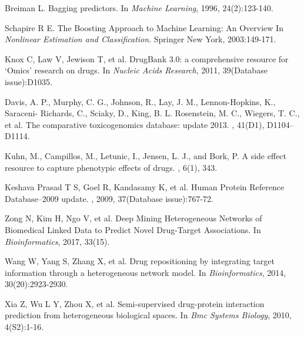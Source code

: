 \documentclass[conference]{IEEEtran}
\begin{document}
\begin{thebibliography}{10}
Breiman L. 
\newblock Bagging predictors. 
\newblock In {\em Machine Learning}, 1996, 24(2):123-140.

Schapire R E. 
\newblock The Boosting Approach to Machine Learning: An Overview
\newblock In {\em Nonlinear Estimation and Classification}. Springer New York, 2003:149-171.

Knox C, Law V, Jewison T, et al. 
\newblock DrugBank 3.0: a comprehensive resource for ‘Omics’ research on drugs. 
\newblock In {\em Nucleic Acids Research}, 2011, 39(Database issue):D1035.

Davis, A. P., Murphy, C. G., Johnson, R., Lay, J. M., Lennon-Hopkins, K., Saraceni- Richards, C., Sciaky, D., King, B. L. Rosenstein, M. C., Wiegers, T. C., et al. 
\newblock The comparative toxicogenomics database: update 2013.
, 41(D1), D1104–D1114.


Kuhn, M., Campillos, M., Letunic, I., Jensen, L. J., and Bork, P.  
\newblock A side effect resource to capture phenotypic effects of drugs. 
, 6(1), 343.

Keshava Prasad T S, Goel R, Kandasamy K, et al. 
\newblock Human Protein Reference Database--2009 update.
, 2009, 37(Database issue):767-72.

Zong N, Kim H, Ngo V, et al. 
\newblock Deep Mining Heterogeneous Networks of Biomedical Linked Data to Predict Novel Drug-Target Associations. 
\newblock In {\em Bioinformatics}, 2017, 33(15).


Wang W, Yang S, Zhang X, et al. 
\newblock Drug repositioning by integrating target information through a heterogeneous network model. 
\newblock In {\em Bioinformatics}, 2014, 30(20):2923-2930.



Xia Z, Wu L Y, Zhou X, et al. 
\newblock Semi-supervised drug-protein interaction prediction from heterogeneous biological spaces. 
\newblock In {\em Bmc Systems Biology}, 2010, 4(S2):1-16.

\end{thebibliography}
\end{document}

